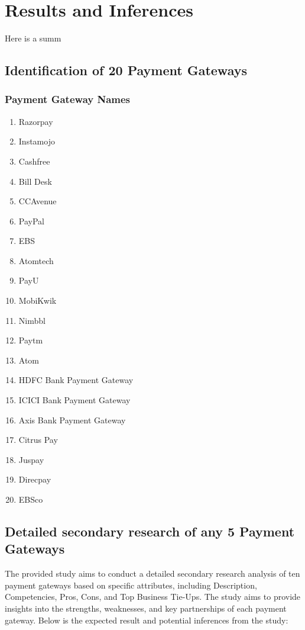 \section{Results and Inferences}
Here is a summ
\subsection{Identification of 20 Payment Gateways}
\subsubsection{Payment Gateway Names}
\begin{enumerate}
    \item Razorpay
    \item Instamojo
    \item Cashfree
    \item Bill Desk
    \item CCAvenue
    \item PayPal
    \item EBS
    \item Atomtech
    \item PayU
    \item MobiKwik
    \item Nimbbl
    \item Paytm
    \item Atom
    \item HDFC Bank Payment Gateway
    \item ICICI Bank Payment Gateway
    \item Axis Bank Payment Gateway
    \item Citrus Pay
    \item Juspay
    \item Direcpay
    \item EBSco
\end{enumerate}

\subsection{Detailed secondary research of any 5 Payment Gateways}
The provided study aims to conduct a detailed secondary research analysis of ten payment gateways based on specific attributes, including Description, Competencies, Pros, Cons, and Top Business Tie-Ups. The study aims to provide insights into the strengths, weaknesses, and key partnerships of each payment gateway. Below is the expected result and potential inferences from the study:

